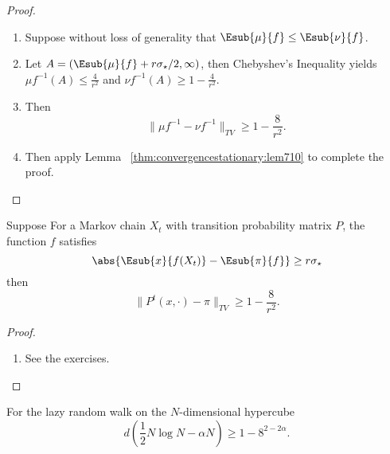 \documentclass[12pt]{article}
\begin{document}
\begin{proof}
    \begin{enumerate}
        \item
            Suppose without loss of generality that \( \Esub{\mu}{f} \le
            \Esub{\nu}{f} \).
        \item
            Let \( A = (\Esub{\mu}{f} + r\sigma_{\star}/2, \infty) \),
            then Chebyshev's Inequality yields \( \mu f^{-1}(A) \le
            \frac{4}{r^2} \) and \( \nu f^{-1}(A) \ge 1 - \frac{4}{r^2} \).
        \item
            Then
            \[
                \| \mu f^{-1} -\nu f^{-1} \|_{TV} \ge 1 - \frac{8}{r^2}.
            \]
        \item
            Then apply Lemma~%
            \ref{thm:convergencestationary:lem710} to complete the
            proof.
    \end{enumerate}
\end{proof}

\begin{corollary}
    \label{thm:convergencestationary:cor79} Suppose For a Markov chain \(
    X_t \) with transition probability matrix \( P \), the function \( f
    \) satisfies
    \[
        \abs{ \Esub{x}{f(X_t)} - \Esub{\pi}{f}} \ge r \sigma_{\star}
    \] then
    \[
        \| P^t(x, \cdot) - \pi \|_{TV} \ge 1 - \frac{8}{r^2}.
    \]
\end{corollary}

\begin{proof}
    \begin{enumerate}
        \item
            See the exercises.
    \end{enumerate}
\end{proof}

\begin{proposition}
    For the lazy random walk on the \( N \)-dimensional hypercube
    \[
        d \left( \frac{1}{2} N \log N - \alpha N \right) \ge 1 - 8^{2 -
        2\alpha}.
    \]
\end{proposition}
\end{document}
